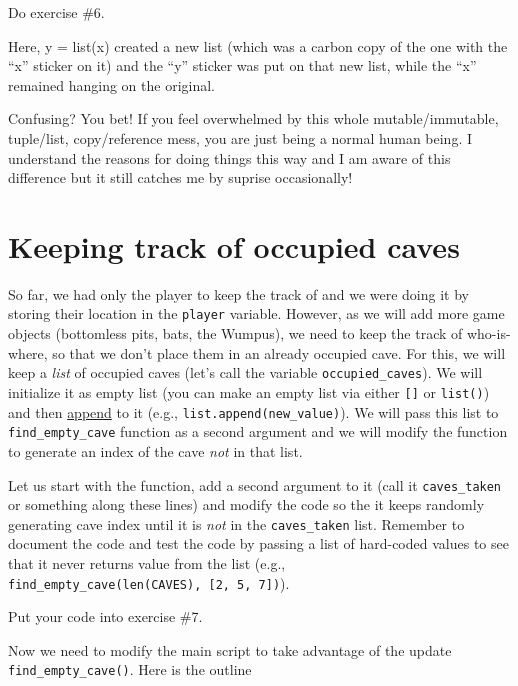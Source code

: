 \documentclass[
]{book}
\begin{document}
Do exercise \#6.

Here, y = list(x) created a new list (which was a carbon copy of the one with the ``x'' sticker on it) and the ``y'' sticker was put on that new list, while the ``x'' remained hanging on the original.

Confusing? You bet! If you feel overwhelmed by this whole mutable/immutable, tuple/list, copy/reference mess, you are just being a normal human being. I understand the reasons for doing things this way and I am aware of this difference but it still catches me by suprise occasionally!

\hypertarget{keeping-track-of-occupied-caves}{%
\section{Keeping track of occupied caves}\label{keeping-track-of-occupied-caves}}

So far, we had only the player to keep the track of and we were doing it by storing their location in the \texttt{player} variable. However, as we will add more game objects (bottomless pits, bats, the Wumpus), we need to keep the track of who-is-where, so that we don't place them in an already occupied cave. For this, we will keep a \emph{list} of occupied caves (let's call the variable \texttt{occupied\_caves}). We will initialize it as empty list (you can make an empty list via either \texttt{{[}{]}} or \texttt{list()}) and then \href{https://docs.python.org/3.8/tutorial/datastructures.html\#more-on-lists}{append} to it (e.g., \texttt{list.append(new\_value)}). We will pass this list to \texttt{find\_empty\_cave} function as a second argument and we will modify the function to generate an index of the cave \emph{not} in that list.

Let us start with the function, add a second argument to it (call it \texttt{caves\_taken} or something along these lines) and modify the code so the it keeps randomly generating cave index until it is \emph{not} in the \texttt{caves\_taken} list. Remember to document the code and test the code by passing a list of hard-coded values to see that it never returns value from the list (e.g., \texttt{find\_empty\_cave(len(CAVES),\ {[}2,\ 5,\ 7{]})}).

Put your code into exercise \#7.

Now we need to modify the main script to take advantage of the update \texttt{find\_empty\_cave()}. Here is the outline
\end{document}
